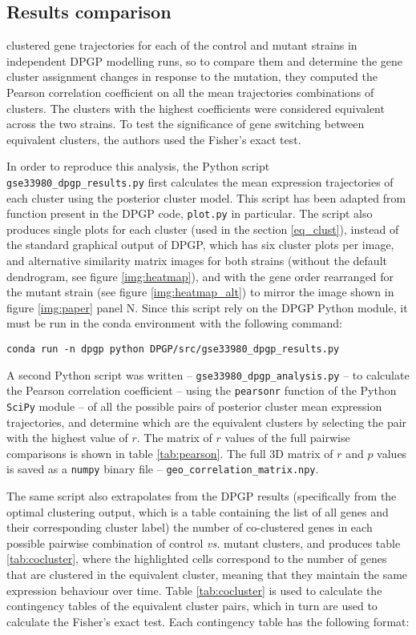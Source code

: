 \subsection{Results comparison}
\citeauthor{mcdowellClusteringGeneExpression2018} clustered gene trajectories for each of the control and mutant strains in independent DPGP modelling runs, so to compare them and determine the gene cluster assignment changes in response to the mutation, they computed the Pearson correlation coefficient on all the mean trajectories combinations of clusters. The clusters with the highest coefficients were considered equivalent across the two strains. To test the significance of gene switching between equivalent clusters, the authors used the Fisher's exact test.

In order to reproduce this analysis, the Python script \texttt{gse33980\_dpgp\_results.py} first calculates the mean expression trajectories of each cluster using the posterior cluster model. This script has been adapted from function present in the DPGP code, \texttt{plot.py} in particular. The script also produces single plots for each cluster (used in the section \ref{eq_clust}), instead of the standard graphical output of DPGP, \label{standard_output} which has six cluster plots per image, and alternative similarity matrix images for both strains (without the default dendrogram, see figure \ref{img:heatmap}), and with the gene order rearranged for the mutant strain (see figure \ref{img:heatmap_alt}) to mirror the image shown in figure \ref{img:paper} panel N. Since this script rely on the DPGP Python module, it must be run in the conda environment with the following command:
\begin{verbatim}
conda run -n dpgp python DPGP/src/gse33980_dpgp_results.py
\end{verbatim}

A second Python script was written -- \texttt{gse33980\_dpgp\_analysis.py} -- to calculate the Pearson correlation coefficient -- using the \texttt{pearsonr} function of the Python \texttt{SciPy} module \citep{virtanenSciPyFundamentalAlgorithms2020} -- of all the possible pairs of posterior cluster mean expression trajectories, and determine which are the equivalent clusters by selecting the pair with the highest value of $r$. The matrix of $r$ values of the full pairwise comparisons is shown in table \ref{tab:pearson}. The full 3D matrix of $r$ and $p$ values is saved as a \texttt{numpy} binary file -- \texttt{geo\_correlation\_matrix.npy}.

The same script also extrapolates from the DPGP results (specifically from the optimal clustering output, which is a table containing the list of all genes and their corresponding cluster label) the number of co-clustered genes in each possible pairwise combination of control \textit{vs.} mutant clusters, and produces table \ref{tab:cocluster}, where the highlighted cells correspond to the number of genes that are clustered in the equivalent cluster, meaning that they maintain the same expression behaviour over time.
Table \ref{tab:cocluster} is used to calculate the contingency tables of the equivalent cluster pairs, which in turn are used to calculate the Fisher's exact test.
Each contingency table has the following format:

